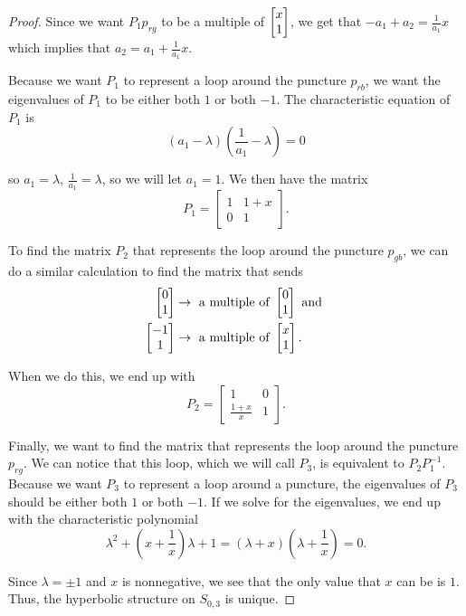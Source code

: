 \documentclass{amsart}
\begin{document}
\begin{proof}
		Since we want $P_1 p_{rg}$ to be a multiple of $\begin{bmatrix} x \\ 1 \end{bmatrix}$, we get that $-a_1 + a_2 = \frac{1}{a_1}x$ which implies that $a_2 = a_{1} + \frac{1}{a_1}x$.
		
		Because we want $P_1$ to represent a loop around the puncture $p_{rb}$, we want the eigenvalues of $P_1$ to be either both $1$ or both $-1$. The characteristic equation of $P_1$ is
		\begin{equation*}
			( a_1 - \lambda)(\frac{1}{a_1} - \lambda) = 0
		\end{equation*}
		
		so $a_1 = \lambda$, $\frac{1}{a_1} = \lambda$, so we will let $a_1 = 1$. We then have the matrix
		\begin{equation*}
			P_1 = 
			\begin{bmatrix}
				1 & 1 + x \\
				0 & 1
			\end{bmatrix}.
		\end{equation*}
		
		To find the matrix $P_2$ that represents the loop around the puncture $p_{gb}$, we can do a similar calculation to find the matrix that sends 
		\begin{align*}
			\begin{bmatrix} 0 \\ 1 \end{bmatrix} & \to \text{ a multiple of } \begin{bmatrix} 0 \\ 1 \end{bmatrix} \text{ and }\\
			\begin{bmatrix} -1 \\ 1 \end{bmatrix} & \to \text{ a multiple of } \begin{bmatrix} x \\ 1 \end{bmatrix}.
		\end{align*}
		
		When we do this, we end up with
		\begin{equation*}
			P_2 = 
			\begin{bmatrix}
				1 & 0 \\
				\frac{1 + x}{x} & 1
			\end{bmatrix}.
		\end{equation*}
		
		Finally, we want to find the matrix that represents the loop around the puncture $p_{rg}$. We can notice that this loop, which we will call $P_3$, is equivalent to $P_2 P_1^{-1}$. Because we want $P_3$ to represent a loop around a puncture, the eigenvalues of $P_3$ should be either both $1$ or both $-1$. If we solve for the eigenvalues, we end up with the characteristic polynomial
		\begin{equation*}
			\lambda^2 + \left(x + \frac{1}{x}\right)\lambda + 1 = (\lambda + x)\left(\lambda + \frac{1}{x}\right) = 0.
		\end{equation*}
		
		Since $\lambda = \pm 1$ and $x$ is nonnegative, we see that the only value that $x$ can be is $1$. Thus, the hyperbolic structure on $S_{0,3}$ is unique.
	\end{proof}
	
\end{document}
